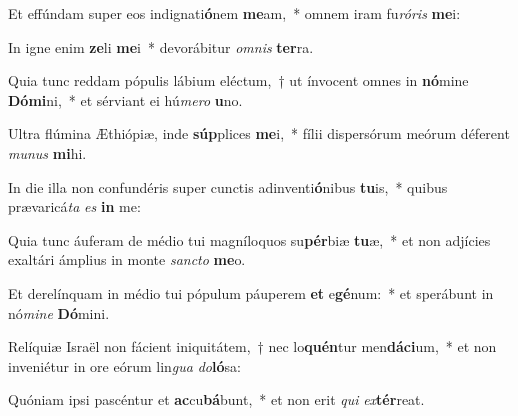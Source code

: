 \item Et effúndam super eos indignati\textbf{ó}nem \textbf{me}am,~* omnem iram fu\textit{ró}\textit{ris} \textbf{me}i:
\item In igne enim \textbf{ze}li \textbf{me}i~* devorábitur \textit{om}\textit{nis} \textbf{ter}ra.
\item Quia tunc reddam pópulis lábium eléctum,~† ut ínvocent omnes in \textbf{nó}mine \textbf{Dó}\textbf{mi}ni,~* et sérviant ei hú\textit{me}\textit{ro} \textbf{u}no.
\item Ultra flúmina Æthiópiæ, inde \textbf{súp}plices \textbf{me}i,~* fílii dispersórum meórum déferent \textit{mu}\textit{nus} \textbf{mi}hi.
\item In die illa non confundéris super cunctis adinventi\textbf{ó}nibus \textbf{tu}is,~* quibus prævaricá\textit{ta} \textit{es} \textbf{in} me:
\item Quia tunc áuferam de médio tui magníloquos su\textbf{pér}biæ \textbf{tu}æ,~* et non adjícies exaltári ámplius in monte \textit{sanc}\textit{to} \textbf{me}o.
\item Et derelínquam in médio tui pópulum páuperem \textbf{et} e\textbf{gé}num:~* et sperábunt in nó\textit{mi}\textit{ne} \textbf{Dó}mini.
\item Relíquiæ Israël non fácient iniquitátem,~† nec lo\textbf{quén}tur men\textbf{dá}\textbf{ci}um,~* et non inveniétur in ore eórum lin\textit{gua} \textit{do}\textbf{ló}sa:
\item Quóniam ipsi pascéntur et \textbf{ac}cu\textbf{bá}bunt,~* et non erit \textit{qui} \textit{ex}\textbf{tér}reat.
